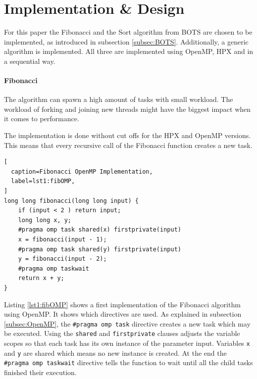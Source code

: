 \section{Implementation \& Design}
  For this paper the Fibonacci and the Sort algorithm from BOTS are chosen to be implemented, as introduced in subsection \ref{subsec:BOTS}.
  Additionally, a generic algorithm is implemented.
  All three are implemented using OpenMP, HPX and in a sequential way.
  
  \paragraph{Fibonacci}
  The algorithm can spawn a high amount of tasks with small workload.
  The workload of forking and joining new threads might have the biggest impact when it comes to performance.
  
  The implementation is done without cut offs for the HPX and OpenMP versions.
  This means that every recursive call of the Fibonacci function creates a new task.
  \begin{lstlisting}[
  caption=Fibonacci OpenMP Implementation,
  label=lst1:fibOMP,
]
long long fibonacci(long long input) {
    if (input < 2 ) return input;
    long long x, y;
    #pragma omp task shared(x) firstprivate(input)
    x = fibonacci(input - 1);
    #pragma omp task shared(y) firstprivate(input)
    y = fibonacci(input - 2);
    #pragma omp taskwait
    return x + y;
}
\end{lstlisting}
  Listing \ref{lst1:fibOMP} shows a first implementation of the Fibonacci algorithm using OpenMP.
  It shows which directives are used.
  As explained in subsection \ref{subsec:OpenMP}, the \texttt{\#pragma omp task} directive creates a new task which may be executed.
  Using the \texttt{shared} and \texttt{firstprivate} clauses adjusts the variable scopes so that each task has its own instance of the parameter input.
  Variables \texttt{x} and \texttt{y} are shared which means no new instance is created.
  At the end the \texttt{\#pragma omp taskwait} directive tells the function to wait until all the child tasks finished their execution.
  
